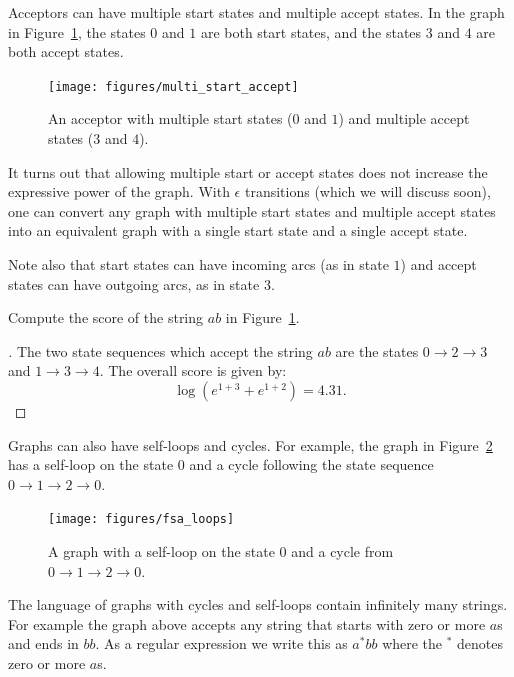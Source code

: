 Acceptors can have multiple start states and multiple accept states. In the
graph in Figure~\ref{fig:multi_start_accept}, the states $0$ and $1$ are both
start states, and the states $3$ and $4$ are both accept states.

\begin{figure}
    \centering
    \texttt{[image: figures/multi\_start\_accept]}
    \caption{An acceptor with multiple start states ($0$ and $1$) and multiple
    accept states ($3$ and $4$).}
    \label{fig:multi_start_accept}
\end{figure}

It turns out that allowing multiple start or accept states does not increase
the expressive power of the graph. With $\epsilon$ transitions (which we will
discuss soon), one can convert any graph with multiple start states and
multiple accept states into an equivalent graph with a single start state and a
single accept state.

Note also that start states can have incoming arcs (as in state $1$) and accept
states can have outgoing arcs, as in state $3$.

\begin{example}
Compute the score of the string $ab$ in Figure~\ref{fig:multi_start_accept}.
\end{example}

\begin{proof}[\unskip\nopunct]
The two state sequences which accept the string $ab$ are the states $0
\rightarrow 2 \rightarrow 3$ and $1 \rightarrow 3 \rightarrow 4$. The overall
score is given by:
$$
\log (e^{1 + 3} + e^{1 + 2}) = 4.31.
$$
\end{proof}

Graphs can also have self-loops and cycles. For example, the graph in
Figure~\ref{fig:fsa_loops} has a self-loop on the state $0$ and a cycle
following the state sequence $0 \rightarrow 1 \rightarrow 2 \rightarrow 0$.

\begin{figure}
    \centering
    \texttt{[image: figures/fsa\_loops]}
    \caption{A graph with a self-loop on the state $0$ and a cycle from $0
    \rightarrow 1 \rightarrow 2 \rightarrow 0$.}
    \label{fig:fsa_loops}
\end{figure}

The language of graphs with cycles and self-loops contain infinitely many
strings. For example the graph above accepts any string that starts with zero
or more $a$s and ends in $bb$. As a regular expression we write this as $a^*bb$
where the $^*$ denotes zero or more $a$s.

